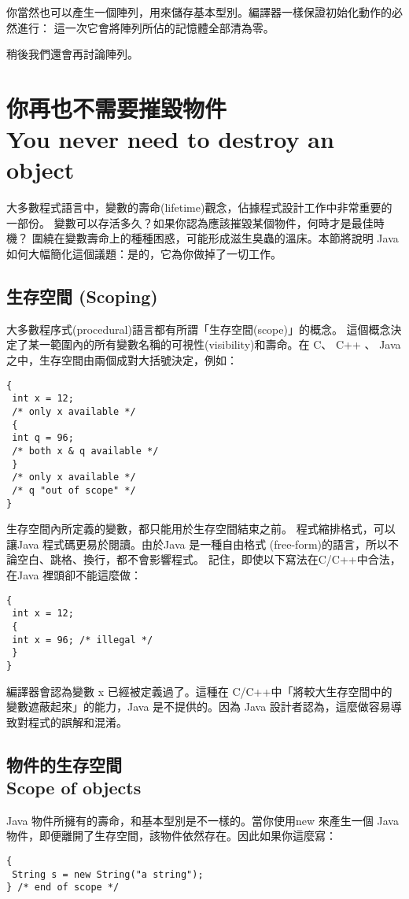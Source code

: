 你當然也可以產生一個陣列，用來儲存基本型別。編譯器一樣保證初始化動作的必然進行：
這一次它會將陣列所佔的記憶體全部清為零。

稍後我們還會再討論陣列。

\section{你再也不需要摧毀物件 \\
You never need to destroy an object}
大多數程式語言中，變數的壽命(lifetime)觀念，佔據程式設計工作中非常重要的一部份。
變數可以存活多久？如果你認為應該摧毀某個物件，何時才是最佳時機？
圍繞在變數壽命上的種種困惑，可能形成滋生臭蟲的溫床。本節將說明
Java 如何大幅簡化這個議題：是的，它為你做掉了一切工作。

\subsection{生存空間 (Scoping)}
大多數程序式(procedural)語言都有所謂「生存空間(scope)」的概念。
這個概念決定了某一範圍內的所有變數名稱的可視性(visibility)和壽命。在
C、 C++ 、 Java 之中，生存空間由兩個成對大括號決定，例如：

\begin{Verbatim}[frame=single]
{
 int x = 12;
 /* only x available */
 {
 int q = 96;
 /* both x & q available */
 }
 /* only x available */
 /* q "out of scope" */
}
\end{Verbatim}
生存空間內所定義的變數，都只能用於生存空間結束之前。
程式縮排格式，可以讓Java 程式碼更易於閱讀。由於Java 是一種自由格式
(free-form)的語言，所以不論空白、跳格、換行，都不會影響程式。
記住，即使以下寫法在C/C++中合法，在Java 裡頭卻不能這麼做：
\begin{Verbatim}[frame=single]
{
 int x = 12;
 {
 int x = 96; /* illegal */
 }
}
\end{Verbatim}
編譯器會認為變數 x 已經被定義過了。這種在
C/C++中「將較大生存空間中的變數遮蔽起來」的能力，Java 是不提供的。因為
Java 設計者認為，這麼做容易導致對程式的誤解和混淆。

\subsection{物件的生存空間 \\
Scope of objects}
Java 物件所擁有的壽命，和基本型別是不一樣的。當你使用new 來產生一個
Java 物件，即便離開了生存空間，該物件依然存在。因此如果你這麼寫：

\begin{Verbatim}[frame=single]
{
 String s = new String("a string");
} /* end of scope */
\end{Verbatim}

